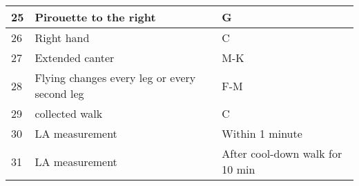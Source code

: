 \begin{table}[!htbp]
{\begin{tabular}{|l|l|l|}
        25 & Pirouette to the right & G \\ \hline
        26 & Right hand & C \\ \hline
        27 & Extended canter & M-K \\ \hline
        28 & Flying changes every leg or every second leg & F-M \\ \hline
        29 & collected walk & C \\ \hline
        30 & LA measurement & Within 1 minute \\ \hline
        31 & LA measurement & After cool-down walk for 10 min \\ \hline
    \end{tabular}}
    \label{dressageSET}
\end{table}